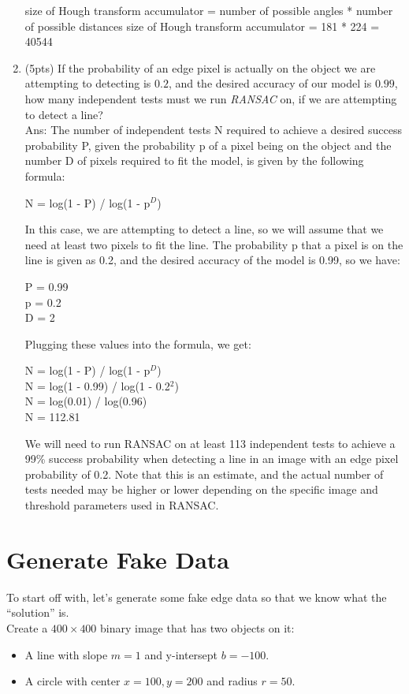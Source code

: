 \documentclass[12pt]{article}
\begin{document}
\begin{enumerate}
size of Hough transform accumulator = number of possible angles * number of possible distances
size of Hough transform accumulator = 181 * 224 = 40544



\item (5pts) If the probability of an edge pixel is actually on the object we are attempting to detecting is $0.2$, and the desired accuracy of our model is $0.99$, how many independent tests must we run \emph{RANSAC} on, if we are attempting to detect a line?\\
Ans: The number of independent tests N required to achieve a desired success probability P, given the probability p of a pixel being on the object and the number D of pixels required to fit the model, is given by the following formula:

N = log(1 - P) / log(1 - p$^D$)

In this case, we are attempting to detect a line, so we will assume that we need at least two pixels to fit the line. The probability p that a pixel is on the line is given as 0.2, and the desired accuracy of the model is 0.99, so we have:

P = 0.99\\
p = 0.2\\
D = 2

Plugging these values into the formula, we get:

N = log(1 - P) / log(1 - p$^D$)\\
N = log(1 - 0.99) / log(1 - 0.2$^2$)\\
N = log(0.01) / log(0.96)\\
N = 112.81

We will need to run RANSAC on at least 113 independent tests to achieve a 99\% success probability when detecting a line in an image with an edge pixel probability of 0.2. Note that this is an estimate, and the actual number of tests needed may be higher or lower depending on the specific image and threshold parameters used in RANSAC.
\end{enumerate}


\newpage
\section{Generate Fake Data}
To start off with, let's generate some fake edge data so that we know what the ``solution'' is.\\

\noindent
Create a $400\times400$ binary image that has two objects on it:
\begin{itemize}
\item A line with slope $m=1$ and y-intersept $b=-100$.
\item A circle with center $x=100, y=200$ and radius $r=50$.
\end{itemize}
\end{document}
